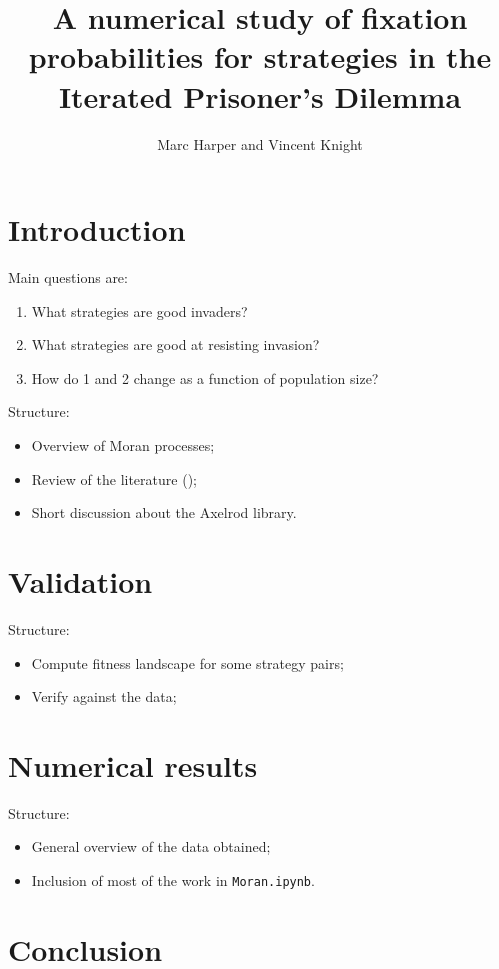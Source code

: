 \documentclass{article}
\title{A numerical study of fixation probabilities for strategies in the
Iterated Prisoner's Dilemma}
\author{Marc Harper and Vincent Knight}
\date{}
\begin{document}
\maketitle


\section{Introduction}\label{sec:introduction}

Main questions are:

\begin{enumerate}
    \item What strategies are good invaders?
    \item What strategies are good at resisting invasion?
    \item How do 1 and 2 change as a function of population size?
\end{enumerate}

Structure:

\begin{itemize}
    \item Overview of Moran processes;
    \item Review of the literature (\cite{Lee2015, Nowak});
    \item Short discussion about the Axelrod library.
\end{itemize}

\section{Validation}\label{sec:validation}

Structure:

\begin{itemize}
    \item Compute fitness landscape for some strategy pairs;
    \item Verify against the data;
\end{itemize}

\section{Numerical results}\label{sec:numerical_results}

Structure:

\begin{itemize}
    \item General overview of the data obtained;
    \item Inclusion of most of the work in \texttt{Moran.ipynb}.
\end{itemize}

\section{Conclusion}\label{sec:conclusion}



\end{document}
